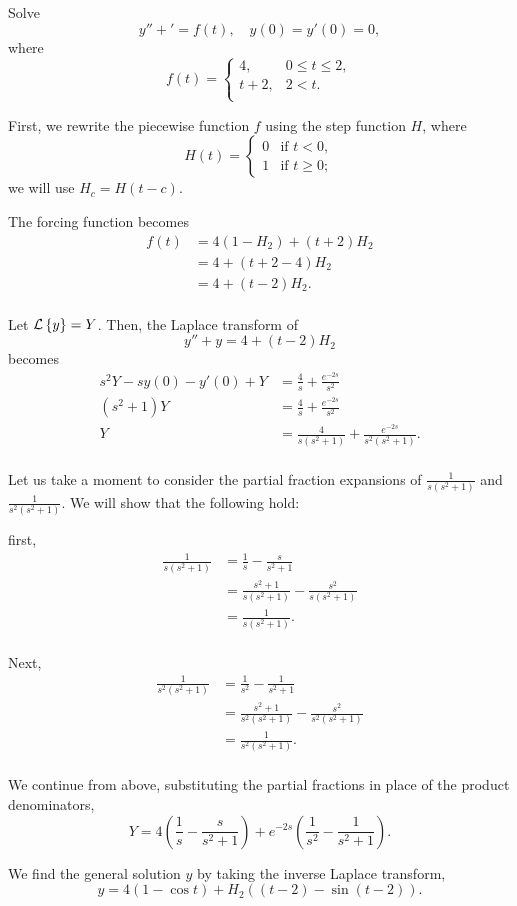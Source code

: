 \documentclass[../hw7]{subfiles}
\begin{document}
Solve \[y''+'=f(t), \quad y(0)=y'(0)=0,\] where \[f(t)=\begin{cases}
    4, & 0\leq t \leq 2, \\
    t+2, & 2<t. \\
\end{cases}\]

First, we rewrite the piecewise function $f$ using the step function $H$, where
\[H(t) = \begin{cases} 
    0 & \text{if } t < 0,\\
    1 & \text{if } t \geq 0;
\end{cases}
\] we will use $H_c=H(t-c)$.

The forcing function becomes
\begin{align*}
    f(t)&=4(1-H_2)+(t+2)H_2 \\
    &= 4+(t+2-4)H_2 \\
    &= 4+(t-2)H_2. \\
\end{align*}

Let $\mathcal{L}\left\{y\right\}=Y$. Then, the Laplace transform of 
\[y''+y=4+(t-2)H_2\]
becomes 
\begin{align*}
    s^2Y-sy(0)-y'(0)+Y&=\frac{4}{s}+\frac{e^{-2s}}{s^2}\\
    (s^2+1)Y&=\frac{4}{s}+\frac{e^{-2s}}{s^2}\\
    Y&=\frac{4}{s(s^2+1)}+\frac{e^{-2s}}{s^2(s^2+1)}.\\
\end{align*}

Let us take a moment to consider the partial fraction expansions of $\frac{1}{s(s^2+1)}$ and $\frac{1}{s^2(s^2+1)}$.
We will show that the following hold:

first, 
\begin{align*}
    \frac{1}{s(s^2+1)}&=\frac{1}{s}-\frac{s}{s^2+1}\\
    &=\frac{s^2+1}{s(s^2+1)}-\frac{s^2}{s(s^2+1)}\\
    &=\frac{1}{s(s^2+1)}.\\
\end{align*}

Next,
\begin{align*}
    \frac{1}{s^2(s^2+1)}&=\frac{1}{s^2}-\frac{1}{s^2+1}\\
    &=\frac{s^2+1}{s^2(s^2+1)}-\frac{s^2}{s^2(s^2+1)}\\
    &=\frac{1}{s^2(s^2+1)}.\\
\end{align*}

We continue from above, substituting the partial fractions in place of the product denominators,
\[Y=4\left( \frac{1}{s}-\frac{s}{s^2+1} \right)+e^{-2s}\left( \frac{1}{s^2}-\frac{1}{s^2+1} \right).\]

We find the general solution $y$ by taking the inverse Laplace transform,
\[y=4(1-\cos{t})+H_2\left( (t-2)-\sin{(t-2)} \right).\]
\end{document}
